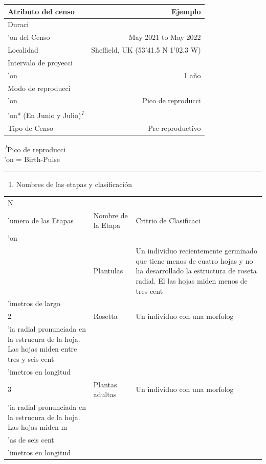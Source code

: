 \documentclass[
  12pt,
  letterpaper,
]{book}
\providecommand{\tightlist}{%
  \setlength{\itemsep}{0pt}\setlength{\parskip}{0pt}}\usepackage{longtable,booktabs,array}
\begin{document}
\begin{table}
\fontsize{12.0pt}{14.0pt}\selectfont
\begin{tabular*}{\linewidth}{@{\extracolsep{\fill}}lr}
\toprule
Atributo del censo & Ejemplo \\ 
\midrule\addlinespace[2.5pt]
Duraci\\'on del Censo & May 2021 to May 2022 \\ 
Localidad & Sheffield, UK (53\textdegree24'41.5 N 1\textdegree30'02.3 W) \\ 
Intervalo de proyecci\\'on & 1 a\~no \\ 
Modo de reproducci\\'on & Pico de reproducci\\'on* (En Junio y Julio)\textsuperscript{\textit{1}} \\ 
Tipo de Censo & Pre-reproductivo \\ 
\bottomrule
\end{tabular*}
\begin{minipage}{\linewidth}
\textsuperscript{\textit{1}}Pico de reproducci\\'on = Birth-Pulse\\
\end{minipage}
\end{table}

\begin{center}\rule{0.5\linewidth}{0.5pt}\end{center}

\begin{enumerate}
\def\labelenumi{(\Alph{enumi})}
\setcounter{enumi}{3}
\tightlist
\item
  Nombres de las etapas y clasificación
\end{enumerate}

\begin{table}
\fontsize{12.0pt}{14.0pt}\selectfont
\begin{tabular*}{\linewidth}{@{\extracolsep{\fill}}lll}
\toprule
N\\'umero de las Etapas & Nombre de la Etapa & Critrio de Clasificaci\\'on \\ 
\midrule\addlinespace[2.5pt]
1 & Plantulas & Un individuo recientemente germinado que tiene menos de cuatro hojas y no ha desarrollado la estructura de roseta radial. El las hojas miden menos de tres cent\\'imetros de largo \\ 
2 & Rosetta & Un individuo con una morfolog\\'ia radial pronunciada en la estrucura de la hoja. Las hojas miden entre tres y seis cent\\'imetros en longitud \\ 
3 & Plantas adultas & Un individuo con una morfolog\\'ia radial pronunciada en la estrucura de la hoja. Las hojas miden m\\'as de seis cent\\'imetros en longitud \\ 
\bottomrule
\end{tabular*}
\end{table}
\end{document}

